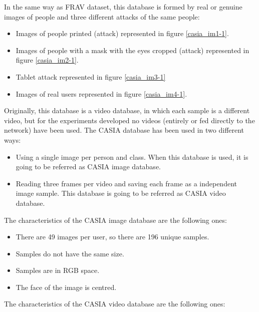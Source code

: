 In the same way as FRAV dataset, this database is formed by real or genuine images of people and three different attacks of the same people:

\begin{itemize}
 \item Images of people printed (attack) represented in figure \ref{casia_im1-1}.
 \item Images of people with a mask with the eyes cropped (attack) represented in figure \ref{casia_im2-1}.
 \item Tablet attack represented in figure \ref{casia_im3-1}
  \item Images of real users represented in figure \ref{casia_im4-1}.
 \end{itemize}

Originally, this database is a video database, in which each sample is a different video, but for the experiments developed no videos (entirely or fed directly to the network) have been used. The CASIA database has been used in two different ways:

\begin{itemize}
 \item Using a single image per person and class. When this database is used, it is going to be referred as CASIA image database.
 \item Reading three frames per video and saving each frame as a independent image sample. This database is going to be referred as CASIA video database.
\end{itemize}

The characteristics of the CASIA image database are the following ones:
\begin{itemize}
\item There are 49 images per user, so there are 196 unique samples.
\item Samples do not have the same size.
\item Samples are in RGB space.
\item The face of the image is centred.
\end{itemize}

The characteristics of the CASIA video database are the following ones:

